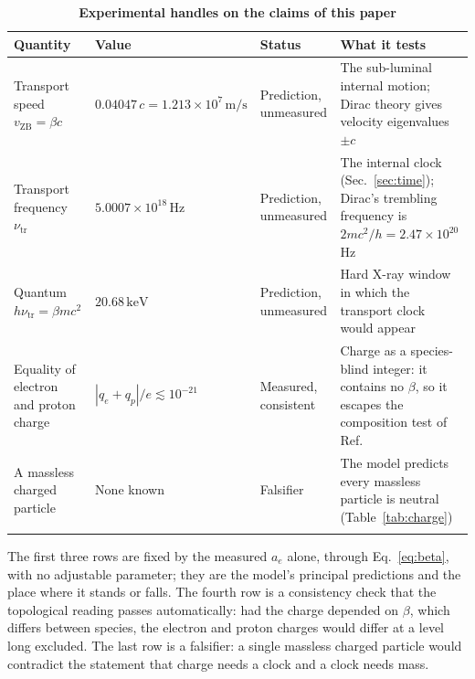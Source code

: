\documentclass[%
 reprint, amsmath,amssymb, aps, prb, ]{revtex4-2}
\numberwithin{equation}{section}
\begin{document}
\begin{table}[t!]
\centering
\caption{\textbf{Experimental handles on the claims of this paper}}
\label{tab:exp}
\renewcommand{\arraystretch}{1.4}
\begin{tabular}{p{4.2cm}p{3.6cm}p{3.2cm}p{4.5cm}}
\toprule
\textbf{Quantity} & \textbf{Value} & \textbf{Status} & \textbf{What it tests} \\
\midrule
Transport speed $v_{\mathrm{ZB}}=\beta c$
& $0.04047\,c=1.213\times10^{7}\,\mathrm{m/s}$
& Prediction, unmeasured
& The sub-luminal internal motion; Dirac theory gives velocity eigenvalues $\pm c$~\cite{ref:breit28,ref:schrodinger} \\
\addlinespace[0.3cm]
Transport frequency $\nu_{\mathrm{tr}}$
& $5.0007\times10^{18}\,\mathrm{Hz}$
& Prediction, unmeasured
& The internal clock (Sec.~\ref{sec:time}); Dirac's trembling frequency is $2mc^2/h=2.47\times10^{20}$ Hz \\
\addlinespace[0.3cm]
Quantum $h\nu_{\mathrm{tr}}=\beta mc^2$
& $20.68\,\mathrm{keV}$
& Prediction, unmeasured
& Hard X-ray window in which the transport clock would appear \\
\addlinespace[0.3cm]
Equality of electron and proton charge
& $|q_e+q_p|/e\lesssim10^{-21}$~\cite{ref:bressi}
& Measured, consistent
& Charge as a species-blind integer: it contains no $\beta$, so it escapes the composition test of Ref.~\cite{ref:p66} \\
\addlinespace[0.3cm]
A massless charged particle
& None known
& Falsifier
& The model predicts every massless particle is neutral (Table~\ref{tab:charge}) \\
\addlinespace[0.2cm]
\bottomrule
\end{tabular}
\vspace{0.2cm}
\begin{minipage}{0.95\textwidth}
\justifying\footnotesize
The first three rows are fixed by the measured $a_e$ alone, through Eq.~\eqref{eq:beta}, with no adjustable parameter; they are the model's principal predictions and the place where it stands or falls. The fourth row is a consistency check that the topological reading passes automatically: had the charge depended on $\beta$, which differs between species, the electron and proton charges would differ at a level long excluded. The last row is a falsifier: a single massless charged particle would contradict the statement that charge needs a clock and a clock needs mass.
\end{minipage}
\end{table}
\end{document}
